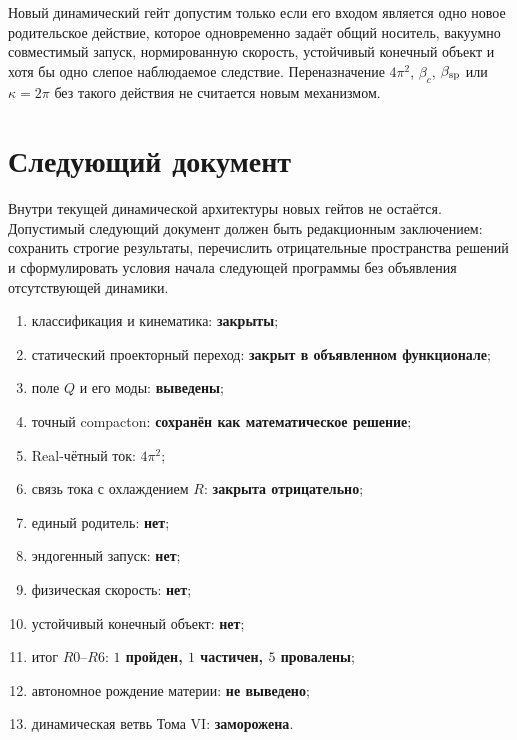 \begin{nogocriterion}
Новый динамический гейт допустим только если его входом является одно
новое родительское действие, которое одновременно задаёт общий носитель,
вакуумно совместимый запуск, нормированную скорость, устойчивый конечный
объект
и хотя бы одно слепое наблюдаемое следствие. Переназначение $4\pi^2$,
$\beta_c$, $\beta_{\rm sp}$ или $\kappa=2\pi$ без такого действия не
считается новым механизмом.
\end{nogocriterion}

\section{Следующий документ}

Внутри текущей динамической архитектуры новых гейтов не остаётся.
Допустимый следующий документ
должен быть редакционным заключением: сохранить строгие результаты,
перечислить отрицательные пространства решений и сформулировать условия
начала следующей программы без объявления отсутствующей динамики.

\begin{protocol}
\begin{enumerate}
 \item классификация и кинематика: \textbf{закрыты};
 \item статический проекторный переход: \textbf{закрыт в объявленном
 функционале};
 \item поле $Q$ и его моды: \textbf{выведены};
 \item точный compacton: \textbf{сохранён как математическое решение};
 \item Real-чётный ток: \textbf{$4\pi^2$};
 \item связь тока с охлаждением $R$: \textbf{закрыта отрицательно};
 \item единый родитель: \textbf{нет};
 \item эндогенный запуск: \textbf{нет};
 \item физическая скорость: \textbf{нет};
 \item устойчивый конечный объект: \textbf{нет};
 \item итог $R0$--$R6$: \textbf{$1$ пройден, $1$ частичен,
 $5$ провалены};
 \item автономное рождение материи: \textbf{не выведено};
 \item динамическая ветвь Тома VI: \textbf{заморожена}.
\end{enumerate}
\end{protocol}

